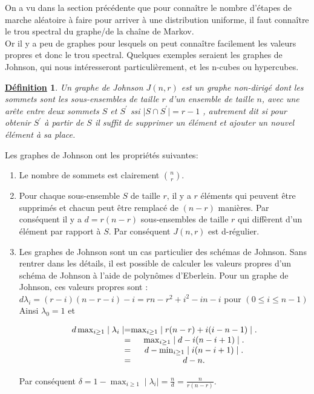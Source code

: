 \documentclass[12pt,openany]{report}
\newtheorem{definition}{\underline{Définition}}
\begin{document}
On a vu dans la section précédente que pour connaître le nombre d’étapes
de marche aléatoire à faire pour arriver à une distribution uniforme, il faut
connaître le trou spectral du graphe/de la chaîne de Markov.\\

Or il y a peu de graphes pour lesquels on peut connaître facilement les valeurs
propres et donc le trou spectral. Quelques exemples seraient les graphes de
Johnson, qui nous intéresseront particulièrement, et les n-cubes ou hypercubes.
\begin{definition} Un graphe de Johnson $J(n, r)$ est un graphe non-dirigé dont les
sommets sont les sous-ensembles de taille $r$ d’un ensemble de taille $n$, avec une
arête entre deux sommets $\mathit{S}$ et $\mathit{S}^{'}$
ssi $ \mid \mathit{S} \cap \mathit{S}^{'}\mid  = r-1$ , autrement dit si pour
obtenir $\mathit{S}^{'} $ à partir de $\mathit{S}$ il suffit de supprimer un élément et ajouter un nouvel
élément à sa place.\cite{Ghazal}
\end{definition}

Les graphes de Johnson ont les propriétés suivantes:
\begin{enumerate}
\item Le nombre de sommets est clairement $ n\choose r $.
\item Pour chaque sous-ensemble $\mathit{S}$ de taille $r$, il y a $r$ éléments qui peuvent être supprimés et chacun peut être remplacé de $(n-r)$ manières. Par conséquent il y a $ d=r(n-r)$ sous-ensembles de taille $r$ qui diffèrent d'un élément par rapport à $\mathit{S}$. Par conséquent $J(n,r)$ est d-régulier.
\item Les graphes de Johnson sont un cas particulier des schémas de Johnson.
Sans rentrer dans les détails, il est possible de calculer les valeurs propres
d’un schéma de Johnson à l’aide de polynômes d’Eberlein. Pour un graphe
de Johnson, ces valeurs propres sont :\\
$d\lambda_i =(r-i)(n-r-i)-i=rn-r^2+i^2-in-i$ pour $(0\leq i \leq n-1)$\\
Ainsi $\lambda_0=1$ et \\
\begin{center}
\[
\left.
\begin{array}{c @{=} c}
   d\max_{i\geq 1} \mid \lambda_i \mid & \max_{i \geq 1} \mid r(n-r) + i(i-n-1)   \mid. \\
& \max_{i \geq 1} \mid d - i(n-i+1)   \mid . \\
& d- \min_{i \geq 1}\mid i(n-i+1)  \mid.  \\
& d-n.
\end{array}
\right.
\]


\end{center}
Par conséquent $ \delta =1-\max_{i\geq 1} \mid \lambda_i \mid = \frac{n}{d}=\frac{n}{r(n-r)}$.
\end{enumerate}
\end{document}
